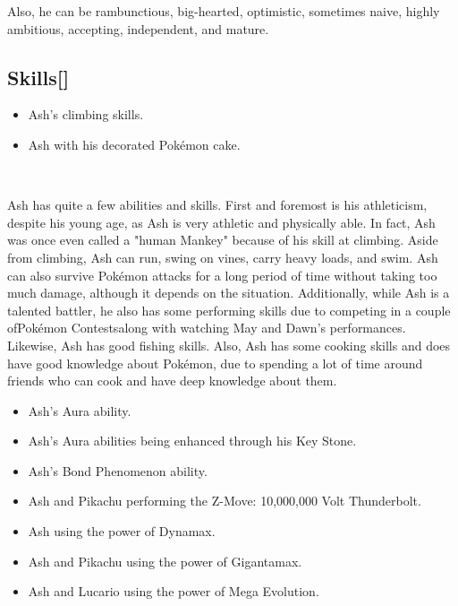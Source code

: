 \documentclass[a4paper,12pt]{article}
\begin{document}
Also, he can be rambunctious, big-hearted, optimistic, sometimes naive, highly ambitious, accepting, independent, and mature.\\ \par \vspace{0.5cm}

\subsection*{Skills[]}\n\n\begin{itemize}
\item Ash's climbing skills.
\item Ash with his decorated Pokémon cake.
\end{itemize}\\ \par \vspace{0.5cm}

Ash has quite a few abilities and skills. First and foremost is his athleticism, despite his young age, as Ash is very athletic and physically able. In fact, Ash was once even called a "human Mankey" because of his skill at climbing. Aside from climbing, Ash can run, swing on vines, carry heavy loads, and swim. Ash can also survive Pokémon attacks for a long period of time without taking too much damage, although it depends on the situation. Additionally, while Ash is a talented battler, he also has some performing skills due to competing in a couple ofPokémon Contestsalong with watching May and Dawn's performances. Likewise, Ash has good fishing skills. Also, Ash has some cooking skills and does have good knowledge about Pokémon, due to spending a lot of time around friends who can cook and have deep knowledge about them.\\ \par \vspace{0.5cm}

\begin{itemize}
\item Ash's Aura ability.
\item Ash's Aura abilities being enhanced through his Key Stone.
\item Ash's Bond Phenomenon ability.
\item Ash and Pikachu performing the Z-Move: 10,000,000 Volt Thunderbolt.
\item Ash using the power of Dynamax.
\item Ash and Pikachu using the power of Gigantamax.
\item Ash and Lucario using the power of Mega Evolution.
\end{itemize}\\ \par \vspace{0.5cm}
\end{document}
